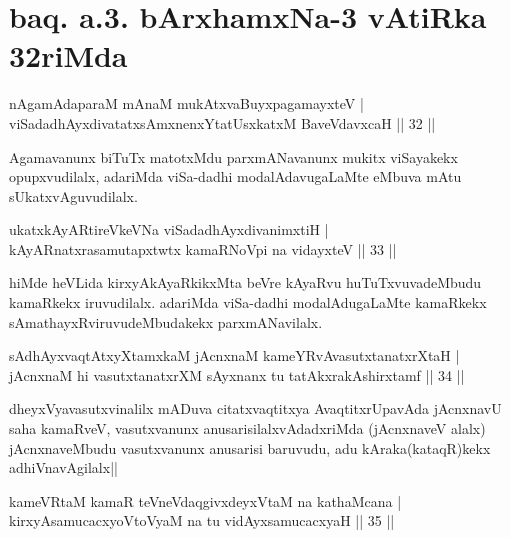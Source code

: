 \section*{baq. a.3. bArxhamxNa-3 vAtiRka 32riMda}

\begin{shl}
nA\s \s gamAdaparaM mAnaM mukAtxvaBuyxpagamayxteV |\\
viSadadhAyxdivatatxsAmxnenxYtatUsxkatxM BaveVdavxcaH \hfill || 32 ||
\end{shl}

\begin{artha}
Agamavanunx biTuTx matotxMdu parxmANavanunx mukitx viSayakekx opupxvudilalx, adariMda 
viSa-dadhi modalAdavugaLaMte eMbuva mAtu sUkatxvAguvudilalx.
\end{artha}


\begin{shl}
ukatxkAyARtireVkeVNa viSadadhAyxdivanimxtiH |\\
kAyARnatxrasamutapxtwtx kamaRNoV\s pi na vidayxteV \hfill || 33 ||
\end{shl}

\begin{artha}
hiMde heVLida kirxyAkAyaRkikxMta beVre kAyaRvu huTuTxvuvadeMbudu kamaRkekx iruvudilalx. adariMda viSa-dadhi modalAdugaLaMte kamaRkekx sAmathayxRviruvudeMbudakekx parxmANavilalx.
\end{artha}


\begin{shl}
sAdhAyxvaqtAtxyXtamxkaM jAcnxnaM kameYRvAvasutxtanatxrXtaH |\\
jAcnxnaM hi vasutxtanatxrXM sAyxnanx tu tatAkxrakAshirxtamf \hfill || 34 ||
\end{shl}

\begin{artha}
dheyxVyavasutxvinalilx mADuva citatxvaqtitxya AvaqtitxrUpavAda jAcnxnavU saha kamaRveV, vasutxvanunx anusarisilalxvAdadxriMda (jAcnxnaveV alalx) jAcnxnaveMbudu vasutxvanunx anusarisi baruvudu, adu kAraka(kataqR)kekx adhiVnavAgilalx||
\end{artha}

\begin{shl}
kameVRtaM kamaR teVneVdaqgivxdeyxVtaM na kathaMcana |\\
kirxyAsamucacxyoV\s toV\s yaM na tu vidAyxsamucacxyaH \hfill || 35 ||
\end{shl}

